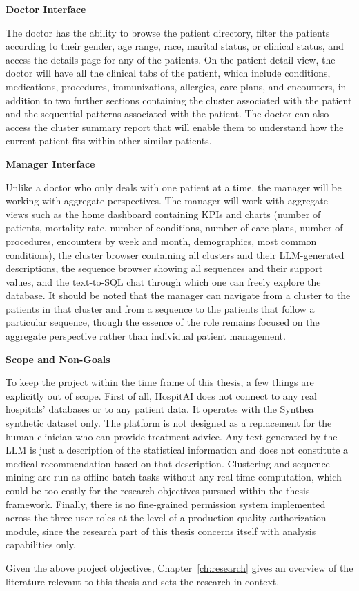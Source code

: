 \vspace{0.5em}
\noindent\textbf{Doctor Interface}

The doctor has the ability to browse the patient directory, filter the patients according to their gender, age range, race, marital status, or clinical status, and access the details page for any of the patients. On the patient detail view, the doctor will have all the clinical tabs of the patient, which include conditions, medications, procedures, immunizations, allergies, care plans, and encounters, in addition to two further sections containing the cluster associated with the patient and the sequential patterns associated with the patient. The doctor can also access the cluster summary report that will enable them to understand how the current patient fits within other similar patients.

\vspace{0.5em}
\noindent\textbf{Manager Interface}

Unlike a doctor who only deals with one patient at a time, the manager will be working with aggregate perspectives. The manager will work with aggregate views such as the home dashboard containing KPIs and charts (number of patients, mortality rate, number of conditions, number of care plans, number of procedures, encounters by week and month, demographics, most common conditions), the cluster browser containing all clusters and their LLM-generated descriptions, the sequence browser showing all sequences and their support values, and the text-to-SQL chat through which one can freely explore the database. It should be noted that the manager can navigate from a cluster to the patients in that cluster and from a sequence to the patients that follow a particular sequence, though the essence of the role remains focused on the aggregate perspective rather than individual patient management.

\vspace{0.5em}
\noindent\textbf{Scope and Non-Goals}

To keep the project within the time frame of this thesis, a few things are explicitly out of scope. First of all, HospitAI does not connect to any real hospitals' databases or to any patient data. It operates with the Synthea synthetic dataset only. The platform is not designed as a replacement for the human clinician who can provide treatment advice. Any text generated by the LLM is just a description of the statistical information and does not constitute a medical recommendation based on that description. Clustering and sequence mining are run as offline batch tasks without any real-time computation, which could be too costly for the research objectives pursued within the thesis framework. Finally, there is no fine-grained permission system implemented across the three user roles at the level of a production-quality authorization module, since the research part of this thesis concerns itself with analysis capabilities only.

Given the above project objectives, Chapter~\ref{ch:research} gives an overview of the literature relevant to this thesis and sets the research in context.
